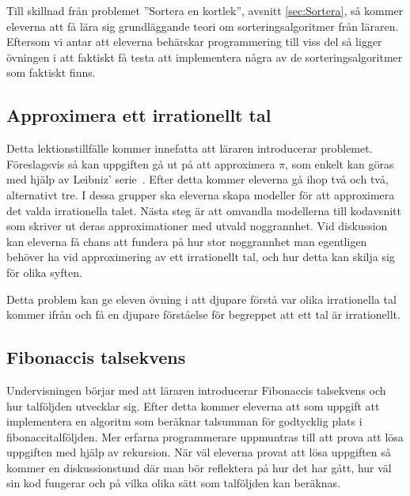     \textcolor{WildStrawberry}{
        Till skillnad från problemet ''Sortera en kortlek'', avsnitt \ref{sec:Sortera}, så kommer eleverna att få lära sig grundläggande teori om sorteringsalgoritmer från läraren. Eftersom vi antar att eleverna behärskar programmering till viss del så ligger övningen i att faktiskt få testa att implementera några av de sorteringsalgoritmer som faktiskt finns.}
        
\subsection{Approximera ett irrationellt tal}
    \label{sec:approx}
    
    \textcolor{WildStrawberry}{
        Detta lektionstillfälle kommer innefatta att läraren introducerar problemet. Föreslagsvis så kan uppgiften gå ut på att approximera $\pi$, som enkelt kan göras med hjälp av Leibniz' serie~\cite{pi}. Efter detta kommer eleverna gå ihop två och två, alternativt tre. I dessa grupper ska eleverna skapa modeller för att approximera det valda irrationella talet. Nästa steg är att omvandla modellerna till kodavsnitt som skriver ut deras approximationer med utvald noggrannhet. 
        Vid diskussion kan eleverna få chans att fundera på hur stor noggrannhet man egentligen behöver ha vid approximering av ett irrationellt tal, och hur detta kan skilja sig för olika syften.
        }
        
    \textcolor{WildStrawberry}{
        Detta problem kan ge eleven övning i att djupare förstå var olika irrationella tal kommer ifrån och få en djupare förståelse för begreppet att ett tal är irrationellt.}
    
\subsection{Fibonaccis talsekvens}
    \label{sec:Fibonacci}
    
    \textcolor{WildStrawberry}{
        Undervisningen börjar med att läraren introducerar Fibonaccis talsekvens och hur talföljden utvecklar sig. Efter detta kommer eleverna att som uppgift att implementera en algoritm som beräknar talsumman för godtycklig plats i fibonaccitalföljden. Mer erfarna programmerare uppmuntras till att prova att lösa uppgiften med hjälp av rekursion. När väl eleverna provat att lösa uppgiften så kommer en diskussionstund där man bör reflektera på hur det har gått, hur väl sin kod fungerar och på vilka olika sätt som talföljden kan beräknas.}
        
